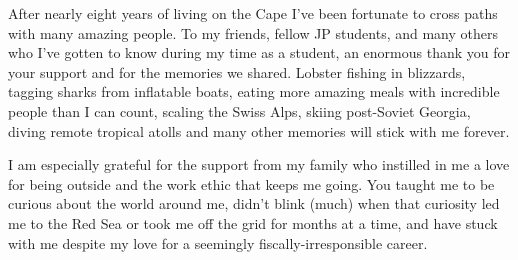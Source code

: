 {After nearly eight years of living on the Cape I’ve been fortunate to cross paths with many amazing people. To my friends, fellow JP students, and many others who I’ve gotten to know during my time as a student, an enormous thank you for your support and for the memories we shared. Lobster fishing in blizzards, tagging sharks from inflatable boats, eating more amazing meals with incredible people than I can count, scaling the Swiss Alps, skiing post-Soviet Georgia, diving remote tropical atolls and many other memories will stick with me forever.

I am especially grateful for the support from my family who instilled in me a love for being outside and the work ethic that keeps me going. You taught me to be curious about the world around me, didn’t blink (much) when that curiosity led me to the Red Sea or took me off the grid for months at a time, and have stuck with me despite my love for a seemingly fiscally-irresponsible career.


}
 


